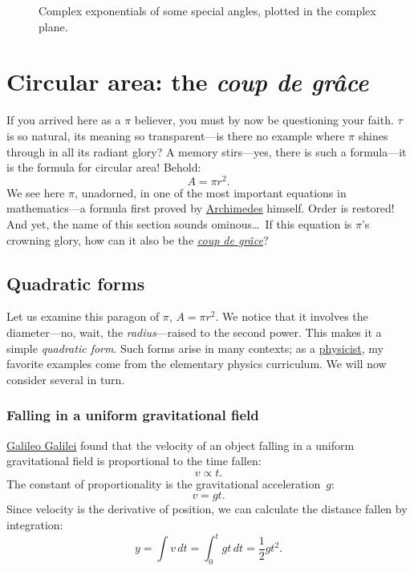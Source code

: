 \begin{figure}
\begin{center}
\end{center}
\caption{Complex exponentials of some special angles, plotted in the complex plane.\label{fig:tau_euler_circle}}
\end{figure}


\section{Circular area: the \emph{coup de gr\^{a}ce}} %
\label{sec:circular_area}

If you arrived here as a $\pi$ believer, you must by now be questioning your faith. $\tau$ is so natural, its meaning so transparent---is there no example where $\pi$ shines through in all its radiant glory? A memory stirs---yes, there is such a formula---it is the formula for circular area! Behold:
\[ A = \pi r^2. \]
We see here $\pi$, unadorned, in one of the most important equations in mathe\-matics---a formula first proved by \href{http://en.wikipedia.org/wiki/Archimedes}{Archimedes} himself. Order is restored! And yet, the name of this section sounds ominous\ldots\ If this equation is $\pi$'s crowning glory, how can it also be the \href{http://en.wikipedia.org/wiki/Coup_de_grace}{\emph{coup de gr\^{a}ce}}?


  \subsection{Quadratic forms} %
  \label{sec:quadratic_forms}

Let us examine this paragon of $\pi$, $A = \pi r^2$. We notice that it involves the diameter---no, wait, the \emph{radius}---raised to the second power. This makes it a simple \emph{quadratic form}. Such forms arise in many contexts; as a \href{http://thesis.library.caltech.edu/1940/}{physicist}, my favorite examples come from the elementary physics curriculum. We will now consider several in turn.

    \subsubsection{Falling in a uniform gravitational field} %
    \label{sec:falling_in_a_uniform_gravitational_field}

\href{http://en.wikipedia.org/wiki/Galileo_Galilei}{Galileo Galilei} found that the velocity of an object falling in a uniform gravitational field is proportional to the time fallen:
\[ v \propto t. \]
The constant of proportionality is the gravitational acceleration~$g$:
\[ v = g t. \]
Since velocity is the derivative of position, we can calculate the distance fallen by integration:
\[ y = \int v\,dt = \int_0^t gt\,dt = \textstyle{\frac{1}{2}} gt^2. \]


